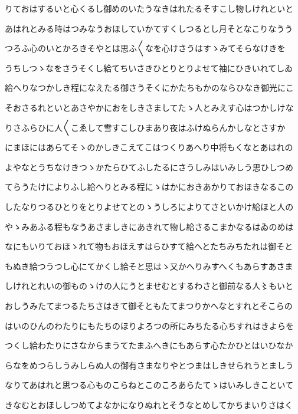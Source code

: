\documentclass[a4paper,11pt,landscape]{ltjtarticle}
\begin{document}
\par\medskip
りておはするいと心くるし御めのいたうなきはれたるそすこし物しけれといと
\par\medskip
あはれとみる時はつみなうおほしていかてすくしつるとし月そとなこりなうう
\par\medskip
つろふ心のいとかろきそやとは思ふ〱なを心けさうはすゝみてそらなけきを
\par\medskip
うちしつゝなをさうそくし給てちいさきひとりとりよせて袖にひきいれてしゐ
\par\medskip
給へりなつかしき程になえたる御さうそくにかたちもかのならひなき御光にこ
\par\medskip
そおさるれといとあさやかにおをしきさましてたゝ人とみえす心はつかしけな
\par\medskip
りさふらひに人〱こゑして雪すこしひまあり夜はふけぬらんかしなとさすか
\par\medskip
にまほにはあらてそゝのかしきこえてこはつくりあへり中将もくなとあはれの
\par\medskip
よやなとうちなけきつゝかたらひてふしたるにさうしみはいみしう思ひしつめ
\par\medskip
てらうたけによりふし給へりとみる程にゝはかにおきあかりておほきなるこの
\par\medskip
したなりつるひとりをとりよせてとのゝうしろによりてさといかけ給ほと人の
\par\medskip
やゝみあふる程もなうあさましきにあきれて物し給さるこまかなるはゐのめは
\par\medskip
なにもいりておほゝれて物もおほえすはらひすて給へとたちみちたれは御そと
\par\medskip
もぬき給つうつし心にてかくし給そと思はゝ又かへりみすへくもあらすあさま
\par\medskip
しけれとれいの御ものゝけの人にうとませむとするわさと御前なる人〻もいと
\par\medskip
おしうみたてまつるたちさはきて御そともたてまつりかへなとすれとそこらの
\par\medskip
はいのひんのわたりにもたちのほりよろつの所にみちたる心ちすれはきよらを
\par\medskip
つくし給わたりにさなからまうてたまふへきにもあらす心たかひとはいひなか
\par\medskip
らなをめつらしうみしらぬ人の御有さまなりやとつまはしきせられうとましう
\par\medskip
なりてあはれと思つる心ものこらねとこのころあらたてゝはいみしきこといて
\par\medskip
きなむとおほししつめてよなかになりぬれとそうなとめしてかちまいりさはく
\end{document}
